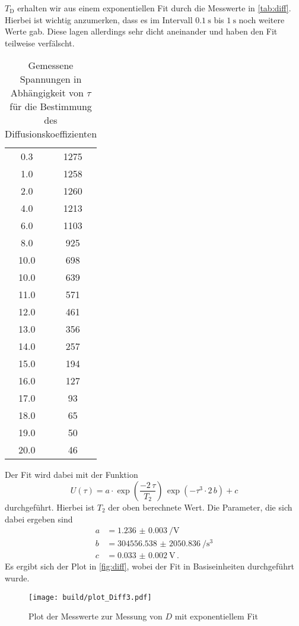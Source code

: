 $T_\text{D}$ erhalten wir aus einem exponentiellen Fit durch die Messwerte in \autoref{tab:diff}.
Hierbei ist wichtig anzumerken, dass es im Intervall $\SI{0.1}{\second}$ bis $\SI{1}{\second}$ noch weitere Werte gab.
Diese lagen allerdings sehr dicht aneinander und haben den Fit teilweise verfälscht.

\begin{table}
    \centering
    \caption{Gemessene Spannungen in Abhängigkeit von $\tau$ für die Bestimmung des Diffusionskoeffizienten}
    \label{tab:diff}
    \begin{tabular}{S[table-format=2.1] S[table-format=4.0]}
        \toprule
        \tableSI{\tau}{\milli\second} &   \\
         & 1275 \\
        1.0 & 1258 \\
        2.0 & 1260 \\
        4.0 & 1213 \\
        6.0 & 1103 \\
        8.0 & 925 \\
        10.0 & 698 \\
        10.0 & 639 \\
        11.0 & 571 \\
        12.0 & 461 \\
        13.0 & 356 \\
        14.0 & 257 \\
        15.0 & 194 \\
        16.0 & 127 \\
        17.0 & 93 \\
        18.0 & 65 \\
        19.0 & 50 \\
        20.0 & 46 \\
        \bottomrule
    \end{tabular}
\end{table}

Der Fit wird dabei mit der Funktion 
\begin{equation}
    U(\tau) = a \cdot \exp(\frac{- 2\,  \tau}{T_2}) \, \exp(- \tau ^3 \cdot 2 \, b) + c 
    \label{eq:fit_d}
\end{equation}
durchgeführt.
Hierbei ist $T_2$ der oben berechnete Wert.
Die Parameter, die sich dabei ergeben sind 
\begin{align*}
    a &= \SI{1.236(3)}{\per\volt} \\
    b &= \SI{304556.538(2050836)}{\per\cubic\second} \\
    c &= \SI{0.033(2)}{\volt} \, .
\end{align*}
Es ergibt sich der Plot in \autoref{fig:diff}, wobei der Fit in Basiseinheiten durchgeführt wurde.
\begin{figure}
    \centering
    \texttt{[image: build/plot\_Diff3.pdf]}
    \caption{Plot der Messwerte zur Messung von $D$ mit exponentiellem Fit}
    \label{fig:diff}
\end{figure}

